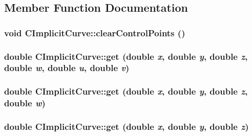 \subsection{Member Function Documentation}
\hypertarget{classCImplicitCurve_af006f40b516aa3ab77d867c3a14894a7}{
\subsubsection[{clearControlPoints}]{\setlength{\rightskip}{0pt plus 5cm}void CImplicitCurve::clearControlPoints ()}}
\label{classCImplicitCurve_af006f40b516aa3ab77d867c3a14894a7}
\hypertarget{classCImplicitCurve_ac36ef3ec30d297a35e45a2b9ee6ddef4}{
\subsubsection[{get}]{\setlength{\rightskip}{0pt plus 5cm}double CImplicitCurve::get (double {\em x}, \/  double {\em y}, \/  double {\em z}, \/  double {\em w}, \/  double {\em u}, \/  double {\em v})}}
\label{classCImplicitCurve_ac36ef3ec30d297a35e45a2b9ee6ddef4}
\hypertarget{classCImplicitCurve_a5207d262ea986451e41df772b9450104}{
\subsubsection[{get}]{\setlength{\rightskip}{0pt plus 5cm}double CImplicitCurve::get (double {\em x}, \/  double {\em y}, \/  double {\em z}, \/  double {\em w})}}
\label{classCImplicitCurve_a5207d262ea986451e41df772b9450104}
\hypertarget{classCImplicitCurve_a65893329ee6d291e41593d79c672d21b}{
\subsubsection[{get}]{\setlength{\rightskip}{0pt plus 5cm}double CImplicitCurve::get (double {\em x}, \/  double {\em y}, \/  double {\em z})}}
